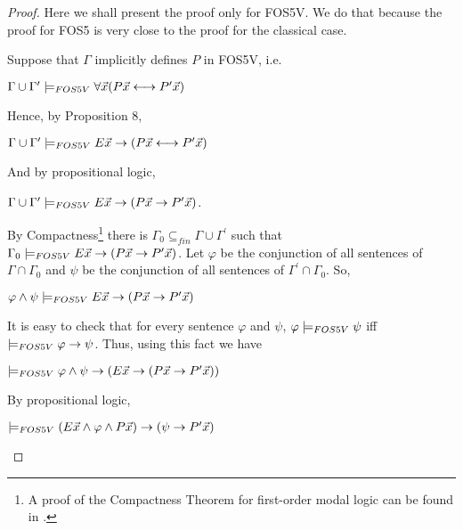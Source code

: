 \begin{proof}
Here we shall present the proof only for FOS5V. We do that because the proof for FOS5 is very close to the proof for the classical case.



\qquad Suppose that $\Gamma$ implicitly defines $P$ in FOS5V, i.e.

\begin{center}
$\Gamma \cup \Gamma^{\prime} \models_{FOS5V} \forall \vec{x}(P\vec{x} \longleftrightarrow P^{\prime}\vec{x})$
\end{center}

\qquad Hence, by Proposition 8,

\begin{center}
$\Gamma \cup \Gamma^{\prime} \models_{FOS5V} E\vec{x} \rightarrow (P\vec{x} \longleftrightarrow P^{\prime}\vec{x})$
\end{center}


\qquad And by propositional logic, 



\begin{center}
$\Gamma \cup \Gamma^{\prime} \models_{FOS5V} E\vec{x} \rightarrow (P\vec{x} \rightarrow P^{\prime}\vec{x})$.
\end{center}




\qquad By Compactness\footnote{A proof of the Compactness Theorem for first-order modal logic can be found in \cite{Fine78}.} there is $\Gamma_0 \subseteq_{fin} \Gamma \cup \Gamma^{\prime}$ such that $\Gamma_{0} \models_{FOS5V} E\vec{x} \rightarrow (P\vec{x} \rightarrow P^{\prime}\vec{x})$. Let $\varphi$ be the conjunction of all sentences of $\Gamma\cap \Gamma_0$ and $\psi$ be the conjunction of all sentences of $\Gamma^{\prime}\cap \Gamma_0$. So, 



\begin{center}
$\varphi\wedge \psi \models_{FOS5V} E\vec{x} \rightarrow (P\vec{x} \rightarrow P^{\prime}\vec{x})$
\end{center}


\qquad It is easy to check that for every sentence $\varphi$ and $\psi$, $\varphi \models_{FOS5V} \psi$ iff $\models_{FOS5V} \varphi \rightarrow\psi$. Thus, using this fact we have 

\begin{center}
$\models_{FOS5V} \varphi\wedge \psi\rightarrow (E\vec{x} \rightarrow (P\vec{x} \rightarrow P^{\prime}\vec{x}))$
\end{center}


\qquad By propositional logic,

\begin{center}
$\models_{FOS5V} (E\vec{x} \wedge \varphi\wedge P\vec{x}) \rightarrow (\psi \rightarrow P^{\prime}\vec{x})$
\end{center}


\end{proof}
